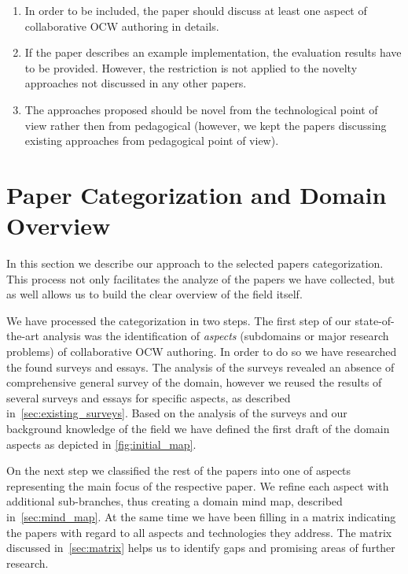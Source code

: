 \documentclass[ngerman,UKenglish,table]{scrbook}
\begin{document}
\begin{itemize}
\begin{enumerate}
\item In order to be included, the paper should discuss at least one aspect of collaborative OCW authoring in details.
\item If the paper describes an example implementation, the evaluation results have to be provided.
However, the restriction is not applied to the novelty approaches not discussed in any other papers.
\item The approaches proposed should be novel from the technological point of view rather then from pedagogical (however, we kept the papers discussing existing approaches from pedagogical point of view).
\end{enumerate}

\end{itemize}

\section{Paper Categorization and Domain Overview}
In this section we describe our approach to the selected papers categorization.
This process not only facilitates the analyze of the papers we have collected, but as well allows us to build the clear overview of the field itself.

We have processed the categorization in two steps.
The first step of our state-of-the-art analysis was the identification of \emph{aspects} (subdomains or major research problems) of collaborative OCW authoring.
In order to do so we have researched the found surveys and essays.
The analysis of the surveys revealed an absence of comprehensive general survey of the domain, however we reused the results of several surveys and essays for specific aspects, as described in~\autoref{sec:existing_surveys}.
Based on the analysis of the surveys and our background knowledge of the field we have defined the first draft of the domain aspects as depicted in \autoref{fig:initial_map}.

On the next step we classified the rest of the papers into one of aspects representing the main focus of the respective paper.
We refine each aspect with additional sub-branches, thus creating a domain mind map, described in~\autoref{sec:mind_map}.
At the same time we have been filling in a matrix indicating the papers with regard to all aspects and technologies they address.
The matrix discussed in~\autoref{sec:matrix} helps us to identify gaps and promising areas of further research.
\end{document}
